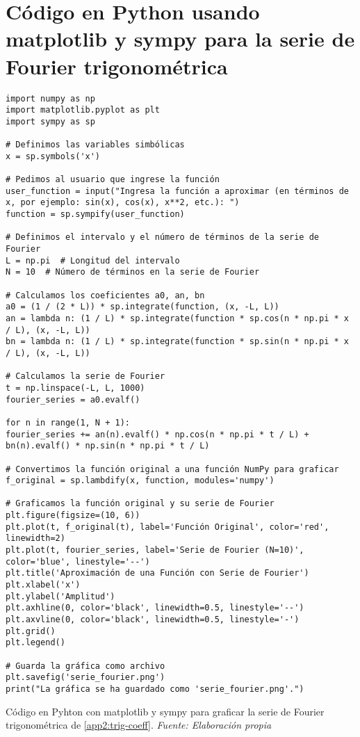 \section{Código en Python usando matplotlib y sympy para la serie de Fourier trigonométrica}\label{app3:trig-code-python-matplotlib-sympy}
\begin{longlisting}
	\begin{verbatim}
import numpy as np
import matplotlib.pyplot as plt
import sympy as sp

# Definimos las variables simbólicas
x = sp.symbols('x')

# Pedimos al usuario que ingrese la función
user_function = input("Ingresa la función a aproximar (en términos de x, por ejemplo: sin(x), cos(x), x**2, etc.): ")
function = sp.sympify(user_function)

# Definimos el intervalo y el número de términos de la serie de Fourier
L = np.pi  # Longitud del intervalo
N = 10  # Número de términos en la serie de Fourier

# Calculamos los coeficientes a0, an, bn
a0 = (1 / (2 * L)) * sp.integrate(function, (x, -L, L))
an = lambda n: (1 / L) * sp.integrate(function * sp.cos(n * np.pi * x / L), (x, -L, L))
bn = lambda n: (1 / L) * sp.integrate(function * sp.sin(n * np.pi * x / L), (x, -L, L))

# Calculamos la serie de Fourier
t = np.linspace(-L, L, 1000)
fourier_series = a0.evalf()

for n in range(1, N + 1):
fourier_series += an(n).evalf() * np.cos(n * np.pi * t / L) + bn(n).evalf() * np.sin(n * np.pi * t / L)

# Convertimos la función original a una función NumPy para graficar
f_original = sp.lambdify(x, function, modules='numpy')

# Graficamos la función original y su serie de Fourier
plt.figure(figsize=(10, 6))
plt.plot(t, f_original(t), label='Función Original', color='red', linewidth=2)
plt.plot(t, fourier_series, label='Serie de Fourier (N=10)', color='blue', linestyle='--')
plt.title('Aproximación de una Función con Serie de Fourier')
plt.xlabel('x')
plt.ylabel('Amplitud')
plt.axhline(0, color='black', linewidth=0.5, linestyle='--')
plt.axvline(0, color='black', linewidth=0.5, linestyle='-')
plt.grid()
plt.legend()

# Guarda la gráfica como archivo
plt.savefig('serie_fourier.png')
print("La gráfica se ha guardado como 'serie_fourier.png'.")
	\end{verbatim}
	\caption[Código en Pyhton con matplotlib y sympy para graficar la serie de Fourier trigonométrica de \ref{app2:trig-coeff}.] {Código en Pyhton con matplotlib y sympy para graficar la serie de Fourier trigonométrica de \ref{app2:trig-coeff}. \textit{Fuente: Elaboración propia}} 
\end{longlisting}


